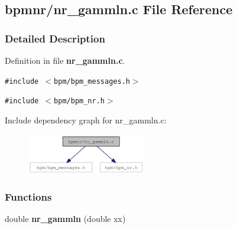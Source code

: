 \subsection{bpmnr/nr\_\-gammln.c File Reference}
\label{nr__gammln_8c}


\subsubsection{Detailed Description}


Definition in file {\bf nr\_\-gammln.c}.

{\tt \#include $<$bpm/bpm\_\-messages.h$>$}\par
{\tt \#include $<$bpm/bpm\_\-nr.h$>$}\par


Include dependency graph for nr\_\-gammln.c:\nopagebreak
\begin{figure}[H]
\begin{center}
\leavevmode
\includegraphics[width=147pt]{nr__gammln_8c__incl}
\end{center}
\end{figure}
\subsubsection*{Functions}
\begin{CompactItemize}
\item 
double {\bf nr\_\-gammln} (double xx)
\end{CompactItemize}
